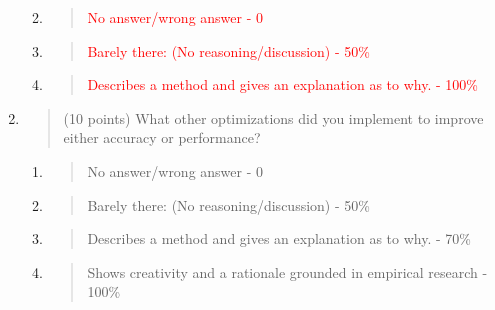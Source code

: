 \documentclass[
]{article}
\begin{document}
\begin{enumerate}
  \begin{enumerate}
  \def\labelenumii{\alph{enumii}.}
  \item
    \begin{quote}
    \textcolor{red}{No answer/wrong answer - 0}
    \end{quote}
  \item
    \begin{quote}
    \textcolor{red}{Barely there: (No reasoning/discussion) - 50\%}
    \end{quote}
  \item
    \begin{quote}
    \textcolor{red}{Describes a method and gives an explanation as to why. - 100\%}
    \end{quote}
  \end{enumerate}
\item
  \begin{quote}
  (10 points) What other optimizations did you implement to improve
  either accuracy or performance?
  \end{quote}

  \begin{enumerate}
  \def\labelenumii{\alph{enumii}.}
  \item
    \begin{quote}
    No answer/wrong answer - 0
    \end{quote}
  \item
    \begin{quote}
    Barely there: (No reasoning/discussion) - 50\%
    \end{quote}
  \item
    \begin{quote}
    Describes a method and gives an explanation as to why. - 70\%
    \end{quote}
  \item
    \begin{quote}
    Shows creativity and a rationale grounded in empirical research -
    100\%
    \end{quote}
  \end{enumerate}
\end{enumerate}
\end{document}
